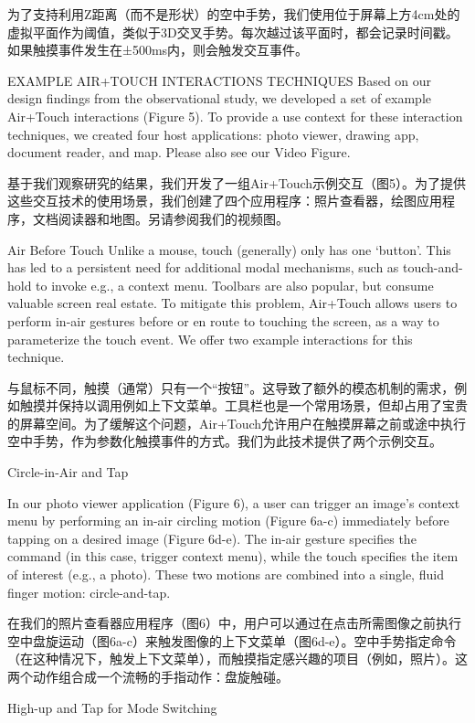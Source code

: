 为了支持利用Z距离（而不是形状）的空中手势，我们使用位于屏幕上方4cm处的虚拟平面作为阈值，类似于3D交叉手势。每次越过该平面时，都会记录时间戳。如果触摸事件发生在±500ms内，则会触发交互事件。

EXAMPLE AIR+TOUCH INTERACTIONS TECHNIQUES
Based on our design findings from the observational study, we developed a set of example Air+Touch interactions (Figure 5). To provide a use context for these interaction techniques, we created four host applications: photo viewer, drawing app, document reader, and map. Please also see our Video Figure. 

基于我们观察研究的结果，我们开发了一组Air+Touch示例交互（图5）。为了提供这些交互技术的使用场景，我们创建了四个应用程序：照片查看器，绘图应用程序，文档阅读器和地图。另请参阅我们的视频图。

Air Before Touch
Unlike a mouse, touch (generally) only has one ‘button’. This has led to a persistent need for additional modal mechanisms, such as touch-and-hold to invoke e.g., a context menu. Toolbars are also popular, but consume valuable screen real estate. To mitigate this problem, Air+Touch allows users to perform in-air gestures before or en route to touching the screen, as a way to parameterize the touch event. We offer two example interactions for this technique.


与鼠标不同，触摸（通常）只有一个“按钮”。这导致了额外的模态机制的需求，例如触摸并保持以调用例如上下文菜单。工具栏也是一个常用场景，但却占用了宝贵的屏幕空间。为了缓解这个问题，Air+Touch允许用户在触摸屏幕之前或途中执行空中手势，作为参数化触摸事件的方式。我们为此技术提供了两个示例交互。

Circle-in-Air and Tap

In our photo viewer application (Figure 6), a user can trigger an image’s context menu by performing an in-air circling motion (Figure 6a-c) immediately before tapping on a desired image (Figure 6d-e). The in-air gesture specifies the command (in this case, trigger context menu), while the touch specifies the item of interest (e.g., a photo). These two motions are combined into a single, fluid finger motion: circle-and-tap. 

在我们的照片查看器应用程序（图6）中，用户可以通过在点击所需图像之前执行空中盘旋运动（图6a-c）来触发图像的上下文菜单（图6d-e）。空中手势指定命令（在这种情况下，触发上下文菜单），而触摸指定感兴趣的项目（例如，照片）。这两个动作组合成一个流畅的手指动作：盘旋触碰。

High-up and Tap for Mode Switching

